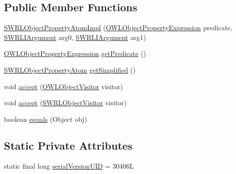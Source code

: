 \subsection*{Public Member Functions}
\begin{DoxyCompactItemize}
\item 
\hyperlink{classuk_1_1ac_1_1manchester_1_1cs_1_1owl_1_1owlapi_1_1_s_w_r_l_object_property_atom_impl_a197710a12cd9729638d581dd2bc8b993}{S\-W\-R\-L\-Object\-Property\-Atom\-Impl} (\hyperlink{interfaceorg_1_1semanticweb_1_1owlapi_1_1model_1_1_o_w_l_object_property_expression}{O\-W\-L\-Object\-Property\-Expression} predicate, \hyperlink{interfaceorg_1_1semanticweb_1_1owlapi_1_1model_1_1_s_w_r_l_i_argument}{S\-W\-R\-L\-I\-Argument} arg0, \hyperlink{interfaceorg_1_1semanticweb_1_1owlapi_1_1model_1_1_s_w_r_l_i_argument}{S\-W\-R\-L\-I\-Argument} arg1)
\item 
\hyperlink{interfaceorg_1_1semanticweb_1_1owlapi_1_1model_1_1_o_w_l_object_property_expression}{O\-W\-L\-Object\-Property\-Expression} \hyperlink{classuk_1_1ac_1_1manchester_1_1cs_1_1owl_1_1owlapi_1_1_s_w_r_l_object_property_atom_impl_aa6dda3b1bd17146acf7a9c2ee8f2ec38}{get\-Predicate} ()
\item 
\hyperlink{interfaceorg_1_1semanticweb_1_1owlapi_1_1model_1_1_s_w_r_l_object_property_atom}{S\-W\-R\-L\-Object\-Property\-Atom} \hyperlink{classuk_1_1ac_1_1manchester_1_1cs_1_1owl_1_1owlapi_1_1_s_w_r_l_object_property_atom_impl_a103348c008bb932287f54049ba48ce99}{get\-Simplified} ()
\item 
void \hyperlink{classuk_1_1ac_1_1manchester_1_1cs_1_1owl_1_1owlapi_1_1_s_w_r_l_object_property_atom_impl_afe36c397f6eb9dd77e94fdc4fe398cc4}{accept} (\hyperlink{interfaceorg_1_1semanticweb_1_1owlapi_1_1model_1_1_o_w_l_object_visitor}{O\-W\-L\-Object\-Visitor} visitor)
\item 
void \hyperlink{classuk_1_1ac_1_1manchester_1_1cs_1_1owl_1_1owlapi_1_1_s_w_r_l_object_property_atom_impl_a7fe281cb72ea802ce8c7894a2e005a39}{accept} (\hyperlink{interfaceorg_1_1semanticweb_1_1owlapi_1_1model_1_1_s_w_r_l_object_visitor}{S\-W\-R\-L\-Object\-Visitor} visitor)
\item 
boolean \hyperlink{classuk_1_1ac_1_1manchester_1_1cs_1_1owl_1_1owlapi_1_1_s_w_r_l_object_property_atom_impl_a25da3ed57be6964d71ff9872f7349227}{equals} (Object obj)
\end{DoxyCompactItemize}
\subsection*{Static Private Attributes}
\begin{DoxyCompactItemize}
\item 
static final long \hyperlink{classuk_1_1ac_1_1manchester_1_1cs_1_1owl_1_1owlapi_1_1_s_w_r_l_object_property_atom_impl_a431bf1433a71c7ac23428ce43fc570fc}{serial\-Version\-U\-I\-D} = 30406\-L
\end{DoxyCompactItemize}


